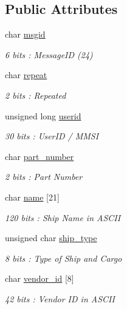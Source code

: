 \subsection*{Public Attributes}
\begin{DoxyCompactItemize}
\item 
char \mbox{\hyperlink{structaismsg__24_a74a2b7bc3f9f59660145982f7343080f}{msgid}}
\begin{DoxyCompactList}\small\item\em 6 bits \+: Message\+ID (24) \end{DoxyCompactList}\item 
char \mbox{\hyperlink{structaismsg__24_a3b7620ae515776496d84d16d75ac4e9e}{repeat}}
\begin{DoxyCompactList}\small\item\em 2 bits \+: Repeated \end{DoxyCompactList}\item 
unsigned long \mbox{\hyperlink{structaismsg__24_a8eabfc1e4a4372e492f82e871cd2f870}{userid}}
\begin{DoxyCompactList}\small\item\em 30 bits \+: User\+ID / M\+M\+SI \end{DoxyCompactList}\item 
char \mbox{\hyperlink{structaismsg__24_a316709966eedd71c28b4d8ae5436e106}{part\+\_\+number}}
\begin{DoxyCompactList}\small\item\em 2 bits \+: Part Number \end{DoxyCompactList}\item 
char \mbox{\hyperlink{structaismsg__24_a439ea42e22b0db680d8d608c08c0b19e}{name}} \mbox{[}21\mbox{]}
\begin{DoxyCompactList}\small\item\em 120 bits \+: Ship Name in A\+S\+C\+II \end{DoxyCompactList}\item 
unsigned char \mbox{\hyperlink{structaismsg__24_ad4e0aaee702cbf90aaf9ad0da5886d32}{ship\+\_\+type}}
\begin{DoxyCompactList}\small\item\em 8 bits \+: Type of Ship and Cargo \end{DoxyCompactList}\item 
char \mbox{\hyperlink{structaismsg__24_af54a6f8e63bb033a2f1189f75a6d7f32}{vendor\+\_\+id}} \mbox{[}8\mbox{]}
\begin{DoxyCompactList}\small\item\em 42 bits \+: Vendor ID in A\+S\+C\+II \end{DoxyCompactList}\item 

\end{DoxyCompactItemize}
